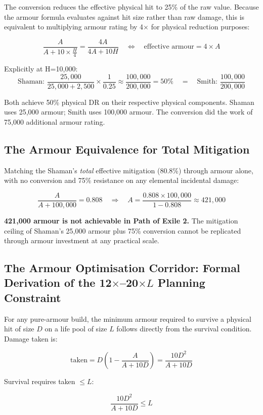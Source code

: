 \documentclass[12pt, letterpaper]{article}
\begin{document}
The conversion reduces the effective physical hit to 25\% of the raw value. Because the armour formula evaluates against hit size rather than raw damage, this is equivalent to multiplying armour rating by 4$\times$ for physical reduction purposes:

\[
\frac{A}{A + 10 \times \tfrac{H}{4}} = \frac{4A}{4A + 10H} \quad \Longleftrightarrow \quad \text{effective armour} = 4 \times A
\]

Explicitly at H=10{,}000:
\[
\text{Shaman: } \frac{25{,}000}{25{,}000 + 2{,}500} \times \frac{1}{0.25} \approx \frac{100{,}000}{200{,}000} = 50\% \quad = \quad \text{Smith: } \frac{100{,}000}{200{,}000}
\]

Both achieve 50\% physical DR on their respective physical components. Shaman uses 25{,}000 armour; Smith uses 100{,}000 armour. The conversion did the work of 75{,}000 additional armour rating.

\subsection*{The Armour Equivalence for Total Mitigation}

Matching the Shaman's \textit{total} effective mitigation (80.8\%) through armour alone, with no conversion and 75\% resistance on any elemental incidental damage:

\[
\frac{A}{A + 100{,}000} = 0.808 \quad \Rightarrow \quad A = \frac{0.808 \times 100{,}000}{1 - 0.808} \approx 421{,}000
\]

\textbf{421{,}000 armour is not achievable in Path of Exile 2.} The mitigation ceiling of Shaman's 25{,}000 armour plus 75\% conversion cannot be replicated through armour investment at any practical scale.

\subsection*{The Armour Optimisation Corridor: Formal Derivation of the 12$\times$--20$\times L$ Planning Constraint}

For any pure-armour build, the minimum armour required to survive a physical hit of size $D$ on a life pool of size $L$ follows directly from the survival condition. Damage taken is:

\[
\text{taken} = D\!\left(1 - \frac{A}{A + 10D}\right) = \frac{10D^2}{A + 10D}
\]

Survival requires taken $\leq L$:

\[
\frac{10D^2}{A + 10D} \leq L
\]
\end{document}
